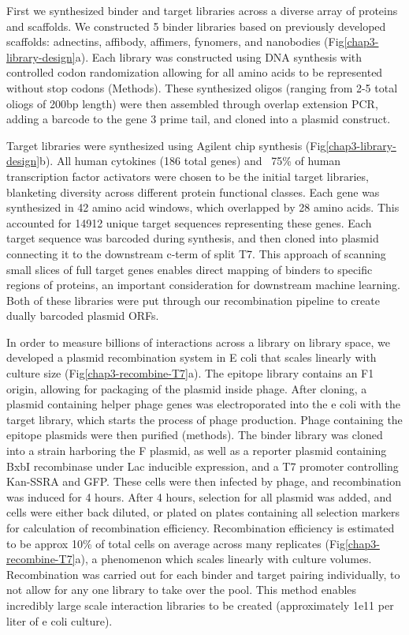 First we synthesized binder and target libraries across a diverse array of proteins and scaffolds. We constructed 5 binder libraries based on previously developed scaffolds: adnectins, affibody, affimers, fynomers, and nanobodies (Fig\ref{chap3-library-design}a). Each library was constructed using DNA synthesis with controlled codon randomization allowing for all amino acids to be represented without stop codons (Methods). These synthesized oligos (ranging from 2-5 total oliogs of 200bp length) were then assembled through overlap extension PCR\cite{Urban1997-ri}, adding a barcode to the gene 3 prime tail, and cloned into a plasmid construct. 

Target libraries were synthesized using Agilent chip synthesis (Fig\ref{chap3-library-design}b). All human cytokines (186 total genes) and ~75\% of human transcription factor activators were chosen to be the initial target libraries, blanketing diversity across different protein functional classes. Each gene was synthesized in 42 amino acid windows, which overlapped by 28 amino acids. This accounted for 14912 unique target sequences representing these genes. Each target sequence was barcoded during synthesis, and then cloned into plasmid connecting it to the downstream c-term of split T7. This approach of scanning small slices of full target genes enables direct mapping of binders to specific regions of proteins, an important consideration for downstream machine learning. Both of these libraries were put through our recombination pipeline to create dually barcoded plasmid ORFs. 

In order to measure billions of interactions across a library on library space, we developed a plasmid recombination system in E coli that scales linearly with culture size (Fig\ref{chap3-recombine-T7}a). The epitope library contains an F1 origin, allowing for packaging of the plasmid inside phage. After cloning, a plasmid containing helper phage genes was electroporated into the e coli with the target library, which starts the process of phage production. Phage containing the epitope plasmids were then purified (methods). The binder library was cloned into a strain harboring the F plasmid, as well as a reporter plasmid containing BxbI recombinase under Lac inducible expression, and a T7 promoter controlling Kan-SSRA and GFP. These cells were then infected by phage, and recombination was induced for 4 hours. After 4 hours, selection for all plasmid was added, and cells were either back diluted, or plated on plates containing all selection markers for calculation of recombination efficiency. Recombination efficiency is estimated to be approx 10\% of total cells on average across many replicates (Fig\ref{chap3-recombine-T7}a), a phenomenon which scales linearly with culture volumes. Recombination was carried out for each binder and target pairing individually, to not allow for any one library to take over the pool. This method enables incredibly large scale interaction libraries to be created (approximately 1e11 per liter of e coli culture). 

